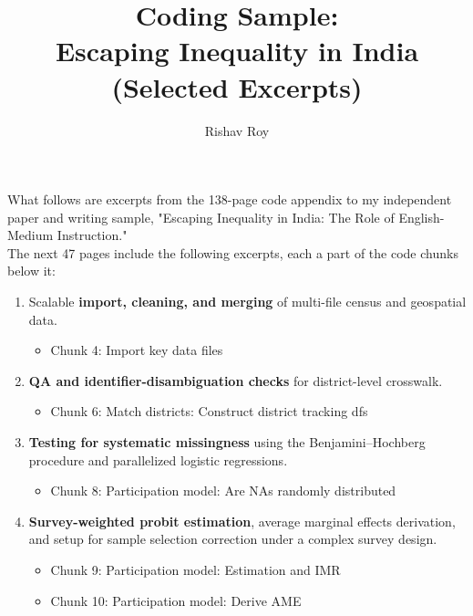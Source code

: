 \documentclass[letterpaper,12pt]{article}
\title{Coding Sample: \\ Escaping Inequality in India \\ \large{(Selected Excerpts)}}
\author{Rishav Roy}
\date{}
\begin{document}
\maketitle
\vspace{-6mm}
\noindent What follows are excerpts from the 138-page code appendix to my independent paper and writing sample, "Escaping Inequality in India: The Role of English-Medium Instruction." \\

\vspace{-2mm}
\noindent The next 47 pages include the following excerpts, each a part of the code chunks below it: 

\begin{enumerate}
\item[14-16:] Scalable \textbf{import, cleaning, and merging} of multi-file census and geospatial data.
\vspace{-2mm}
\begin{itemize}
\item Chunk 4: Import key data files
\end{itemize}
\vspace{-2mm}

\item[31-32:] \textbf{QA and identifier-disambiguation checks} for district-level crosswalk.
\vspace{-2mm}
\begin{itemize}
\item Chunk 6: Match districts: Construct district tracking dfs
\end{itemize}
\vspace{-2mm}

\item[50-52:] \textbf{Testing for systematic missingness} using the Benjamini–Hochberg procedure and parallelized logistic regressions. 
\vspace{-2mm}
\begin{itemize}
\item Chunk 8: Participation model: Are NAs randomly distributed
\end{itemize}
\vspace{-2mm}

\item[55-57:] \textbf{Survey-weighted probit estimation}, average marginal effects derivation, and setup for sample selection correction under a complex survey design.
\vspace{-2mm}
\begin{itemize}
\item Chunk 9: Participation model: Estimation and IMR 
\vspace{-1mm}
\item Chunk 10: Participation model: Derive AME
\end{itemize}
\vspace{-2mm}


\end{enumerate}
\end{document}
